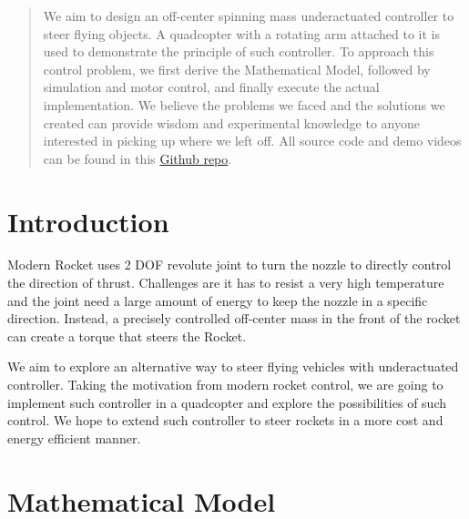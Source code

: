 \begin{abstract}
  We aim to design an off-center spinning mass underactuated controller to steer flying objects. A quadcopter with a rotating arm attached to it is used to demonstrate the principle of such controller. To approach this control problem, we first derive the Mathematical Model, followed by simulation and motor control, and finally execute the actual implementation. We believe the problems we faced and the solutions we created can provide wisdom and experimental knowledge to anyone interested in picking up where we left off. All source code and demo videos can be found in this \href{https://github.com/Amir-Omidfar/183DB-}{Github repo}.
\end{abstract}
\tableofcontents
\newpage
\section{Introduction}
  Modern Rocket uses 2 DOF revolute joint to turn the nozzle to directly control the direction of thrust. Challenges are it has to resist a very high temperature and the joint need a large amount of energy to keep the nozzle in a specific direction. Instead, a precisely controlled off-center mass in the front of the rocket can create a torque that steers the Rocket. \par
  We aim to explore an alternative way to steer flying vehicles with underactuated controller. Taking the motivation from modern rocket control, we are going to implement such controller in a quadcopter and explore the possibilities of such control. We hope to extend such controller to steer rockets in a more cost and energy efficient manner.
\section{Mathematical Model}
